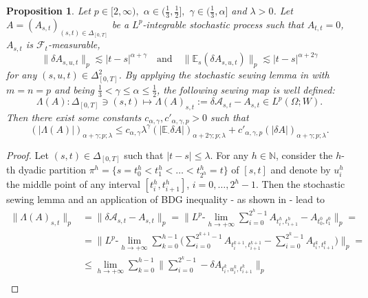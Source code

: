 \documentclass[11pt,a4paper]{article}
\newcommand{\E}{\mathbb{E}}
\theoremstyle{plain}
\newtheorem{prop}[defn]{Proposition}
\begin{document}
\begin{appendices}
\begin{prop} \label{prop:sewingmap}
    Let $p \in [2,\infty),$ $\alpha \in (\frac{1}{3},\frac{1}{2}],$ $\gamma \in (\frac{1}{3},\alpha]$ and $\lambda>0$. Let $A=(A_{s,t})_{(s,t)\in\Delta_{[0,T]}}$ be a $L^p$-integrable stochastic process such that $A_{t,t}=0$, $A_{s,t}$ is $\mathcal{F}_t$-measurable, \begin{equation*}
        \|\delta A_{s,u,t}\|_p\lesssim|t-s|^{\alpha+\gamma} \quad \text{and} \quad \|\E_s(\delta A_{s,u,t})\|_p\lesssim|t-s|^{\alpha+2\gamma}
    \end{equation*} for any $(s,u,t)\in\Delta^2_{[0,T]}$. 
    By applying the stochastic sewing lemma in \cite[Theorem 2.9]{FHL21} 
    with $m=n=p$ and being $\frac{1}{3}<\gamma \le \alpha \le \frac{1}{2}$, the following sewing map is well defined: \begin{equation*} \Lambda(A): \Delta_{[0,T]} \ni (s,t) \longmapsto \Lambda(A)_{s,t} := \delta \mathcal{A}_{s,t}-A_{s,t} \in L^p(\Omega;W). \end{equation*}  Then there exist some constants $c_{\alpha,\gamma},c'_{\alpha,\gamma,p} >0$ such that 
    \begin{equation} \label{eq:sewingmap}
        (|\Lambda(A)|)_{\alpha+\gamma;p;\lambda} \le c_{\alpha,\gamma} \lambda^\gamma(|\E_\cdot \delta A|)_{\alpha+2\gamma;p;\lambda}+c'_{\alpha,\gamma,p}(|\delta A|)_{\alpha+\gamma;p;\lambda}.
    \end{equation}
\end{prop}
\begin{proof}
Let $(s,t)\in\Delta_{[0,T]}$ such that $|t-s|\le\lambda$. For any $h \in \mathbb{N}$, consider the $h$-th dyadic partition $\pi^{h}=\{s=t_0^h<t_1^h<\dots<t_{2^h}^h=t\}$ of $[s,t]$ and denote by $u_i^h$ the middle point of any interval $[t_i^h,t_{i+1}^h]$, $i=0,\dots,2^h-1$. Then the stochastic sewing lemma \cite[Theorem 2.9]{FHL21} and an application of BDG inequality - as shown in \cite[Section 2]{LE20} - lead to 
\begin{align*}
        \|\Lambda(A)_{s,t}\|_p &= \|\delta \mathcal{A}_{s,t}-A_{s,t}\|_p = \|L^p\text{-}\lim_{h\to +\infty}\sum_{i=0}^{2^h-1} A_{t_i^h,t_{i+1}^h}-A_{t^0_0,t^0_1}\|_p = \\ 
        &= \|L^p\text{-}\lim_{h\to +\infty} \sum_{k=0}^{h-1} \big(\sum_{i=0}^{2^{k+1}-1} A_{t_i^{k+1},t_{i+1}^{k+1}}- \sum_{i=0}^{2^k-1} A_{t_i^k,t_{i+1}^k}\big)\|_p = \\ 
        &\le \lim_{h \to +\infty} \sum_{k=0}^{h-1}\|\sum_{i=0}^{2^k-1} -\delta A_{t_i^k,u_i^k,t_{i+1}^k}\|_p  \\ 

\end{align*}
\end{proof}
\end{appendices}
\end{document}

